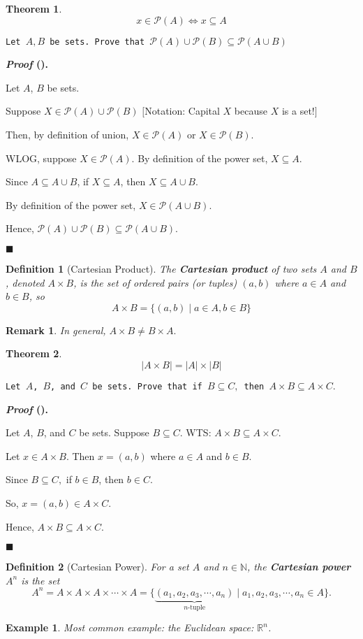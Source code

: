 \documentclass[12pt,a4paper]{article}
\newtheorem{thm}{Theorem}[subsection]
\newtheorem{df}{Definition}[subsection]
\newtheorem{eg}{Example}[subsection]
\newcounter{nprf}[subsection]
\newtheorem*{rmk}{\indent Remark}
\newenvironment*{prf}{\par\indent\textbf{\textit{Proof} (\stepcounter{nprf}\thenprf). }\par}{\par\hfill $\blacksquare$\par}
\def\R{{\mathbb{R}}}
\def\N{{\mathbb{N}}}
\def\pow{{\mathcal{P}}}
\begin{document}
\begin{thm}
	\[x\in\pow(A)\iff x\subseteq A\]	
\end{thm}
\begin{framed}
\noindent\texttt{Let $A, B$ be sets. Prove that $\pow(A)\cup\pow(B)\subseteq\pow(A\cup B)$}
\begin{prf}
	Let $A$, $B$ be sets.\par Suppose $X\in\pow(A)\cup\pow(B)$ $\big[$Notation: Capital $X$ because $X$ is a set!$\big]$\par Then, by definition of union, $X\in\pow(A)$ or $X\in\pow(B).$\par WLOG, suppose $X\in\pow(A).$ By definition of the power set, $X\subseteq A$.\par Since $A\subseteq A\cup B$, if $X\subseteq A$, then $X\subseteq A\cup B$.\par By definition of the power set, $X\in\pow(A\cup B).$\par Hence, $\pow(A)\cup\pow(B)\subseteq\pow(A\cup B).$
\end{prf}
\end{framed}
\begin{df}[Cartesian Product]
	The \textbf{Cartesian product} of two sets $A$ and $B$, denoted $A\times B$, is the set of ordered pairs (or tuples) $(a,b)$ where $a\in A$ and $b\in B$, so \[A\times B=\{(a,b)\mid a\in A, b\in B\}\]
\end{df}
\begin{rmk} In general, $A\times B\neq B\times A.$\end{rmk}
\begin{thm}
	\[|A\times B|=|A|\times|B|\]	
\end{thm}
\begin{framed}
\noindent\texttt{Let $A$, $B$, and $C$ be sets. Prove that if $B\subseteq C,$ then $A\times B\subseteq A\times C.$}
\begin{prf}
	Let $A$, $B$, and $C$ be sets. Suppose $B\subseteq C$. WTS: $A\times B\subseteq A\times C.$\par Let $x\in A\times B$. Then $x=(a,b)$ where $a\in A$ and $b\in B.$\par Since $B\subseteq C,$ if $b\in B$, then $b\in C.$\par So, $x=(a,b)\in A\times C.$\par Hence, $A\times B\subseteq A\times C.$	
\end{prf}
\end{framed}
\begin{df}[Cartesian Power]
	For a set $A$ and $n\in\N$, the \textbf{Cartesian power} $A^n$ is the set \[A^n=A\times A\times A\times\cdots\times A=\{\underbrace{(a_1,a_2,a_3,\cdots,a_n)}_{n\text{-tuple}}\mid a_1,a_2,a_3,\cdots,a_n\in A\}.\]	
\end{df}
\begin{eg}
	Most common example: the Euclidean space: $\R^n$.	
\end{eg}
\end{document}
